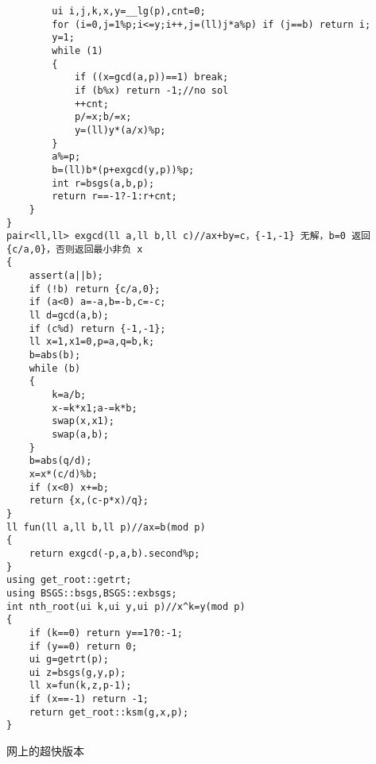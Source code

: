 \documentclass[12pt]{ctexart}
\begin{document}
\begin{lstlisting}
		ui i,j,k,x,y=__lg(p),cnt=0;
		for (i=0,j=1%p;i<=y;i++,j=(ll)j*a%p) if (j==b) return i;
		y=1;
		while (1)
		{
			if ((x=gcd(a,p))==1) break;
			if (b%x) return -1;//no sol
			++cnt;
			p/=x;b/=x;
			y=(ll)y*(a/x)%p;
		}
		a%=p;
		b=(ll)b*(p+exgcd(y,p))%p;
		int r=bsgs(a,b,p);
		return r==-1?-1:r+cnt;
	}
}
pair<ll,ll> exgcd(ll a,ll b,ll c)//ax+by=c，{-1,-1} 无解，b=0 返回 {c/a,0}，否则返回最小非负 x
{
	assert(a||b);
	if (!b) return {c/a,0};
	if (a<0) a=-a,b=-b,c=-c;
	ll d=gcd(a,b);
	if (c%d) return {-1,-1};
	ll x=1,x1=0,p=a,q=b,k;
	b=abs(b);
	while (b)
	{
		k=a/b;
		x-=k*x1;a-=k*b;
		swap(x,x1);
		swap(a,b);
	}
	b=abs(q/d);
	x=x*(c/d)%b;
	if (x<0) x+=b;
	return {x,(c-p*x)/q};
}
ll fun(ll a,ll b,ll p)//ax=b(mod p)
{
	return exgcd(-p,a,b).second%p;
}
using get_root::getrt;
using BSGS::bsgs,BSGS::exbsgs;
int nth_root(ui k,ui y,ui p)//x^k=y(mod p)
{
	if (k==0) return y==1?0:-1;
	if (y==0) return 0;
	ui g=getrt(p);
	ui z=bsgs(g,y,p);
	ll x=fun(k,z,p-1);
	if (x==-1) return -1;
	return get_root::ksm(g,x,p);
}
\end{lstlisting}

网上的超快版本
\end{document}
